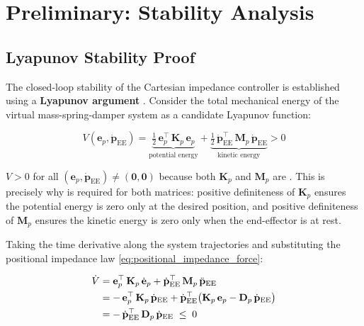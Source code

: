 \section{Preliminary: Stability Analysis}
\label{sec:exp_stability}

\subsection{Lyapunov Stability Proof}

The closed-loop stability of the Cartesian impedance controller is
established using a \textbf{Lyapunov argument} \cite{Siciliano2009}.
Consider the total mechanical energy of the virtual mass-spring-damper
system as a candidate Lyapunov function:

\begin{equation}
\label{eq:lyapunov}
V(\mathbf{e}_p, \dot{\mathbf{p}}_{\mathrm{EE}}) =
\underbrace{\tfrac{1}{2}\,\mathbf{e}_p^\top\,\mathbf{K}_p\,\mathbf{e}_p}_{\text{potential energy}}
+
\underbrace{\tfrac{1}{2}\,\dot{\mathbf{p}}_{\mathrm{EE}}^\top\,\mathbf{M}_p\,\dot{\mathbf{p}}_{\mathrm{EE}}}_{\text{kinetic energy}}
> 0
\end{equation}

$V > 0$ for all $(\mathbf{e}_p, \dot{\mathbf{p}}_{\mathrm{EE}}) \neq (\mathbf{0},\mathbf{0})$
because both $\mathbf{K}_p$ and $\mathbf{M}_p$ are .
This is precisely why  is required for both matrices: positive definiteness
of $\mathbf{K}_p$ ensures the potential energy is zero only at the desired
position, and positive definiteness of $\mathbf{M}_p$ ensures the kinetic
energy is zero only when the end-effector is at rest.

Taking the time derivative along the system trajectories and substituting the
positional impedance law \cref{eq:positional_impedance_force}:

\begin{align}
\dot{V}
&= \mathbf{e}_p^\top\,\mathbf{K}_p\,\dot{\mathbf{e}}_p
 + \dot{\mathbf{p}}_{\mathrm{EE}}^\top\,\mathbf{M}_p\,\ddot{\mathbf{p}}_{\mathrm{EE}}
\notag\\
&= -\,\mathbf{e}_p^\top\,\mathbf{K}_p\,\dot{\mathbf{p}}_{\mathrm{EE}}
 + \dot{\mathbf{p}}_{\mathrm{EE}}^\top\bigl(\mathbf{K}_p\,\mathbf{e}_p
   - \mathbf{D}_p\,\dot{\mathbf{p}}_{\mathrm{EE}}\bigr)
\notag\\
\label{eq:Vdot}
&= -\,\dot{\mathbf{p}}_{\mathrm{EE}}^\top\,\mathbf{D}_p\,\dot{\mathbf{p}}_{\mathrm{EE}}
\;\leq\; 0
\end{align}

